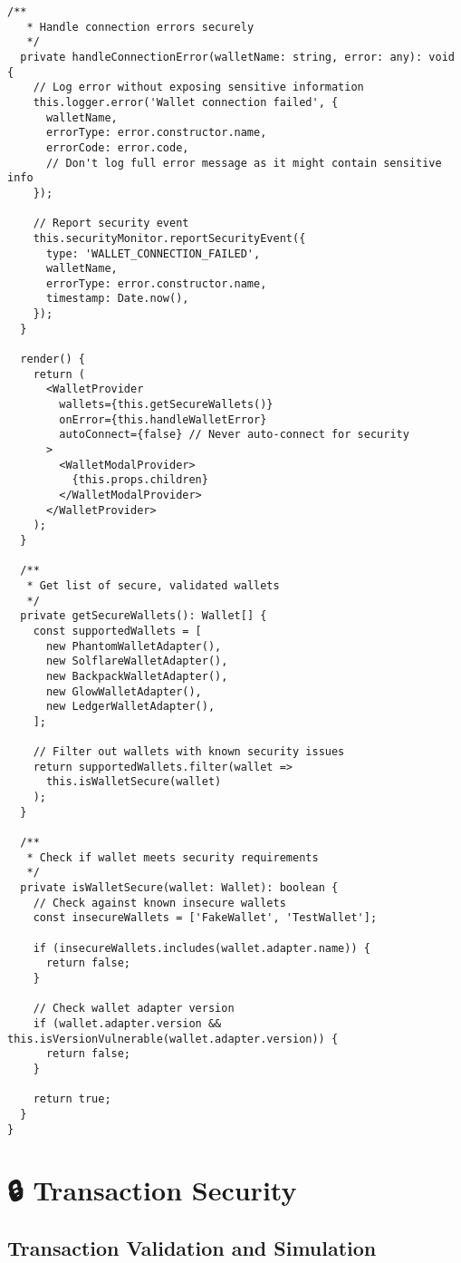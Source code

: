 \documentclass[11pt,a4paper]{article}
\begin{document}
\begin{lstlisting}[style=typescript, caption=Secure Wallet Provider Implementation]
  /**
   * Handle connection errors securely
   */
  private handleConnectionError(walletName: string, error: any): void {
    // Log error without exposing sensitive information
    this.logger.error('Wallet connection failed', {
      walletName,
      errorType: error.constructor.name,
      errorCode: error.code,
      // Don't log full error message as it might contain sensitive info
    });

    // Report security event
    this.securityMonitor.reportSecurityEvent({
      type: 'WALLET_CONNECTION_FAILED',
      walletName,
      errorType: error.constructor.name,
      timestamp: Date.now(),
    });
  }

  render() {
    return (
      <WalletProvider
        wallets={this.getSecureWallets()}
        onError={this.handleWalletError}
        autoConnect={false} // Never auto-connect for security
      >
        <WalletModalProvider>
          {this.props.children}
        </WalletModalProvider>
      </WalletProvider>
    );
  }

  /**
   * Get list of secure, validated wallets
   */
  private getSecureWallets(): Wallet[] {
    const supportedWallets = [
      new PhantomWalletAdapter(),
      new SolflareWalletAdapter(),
      new BackpackWalletAdapter(),
      new GlowWalletAdapter(),
      new LedgerWalletAdapter(),
    ];

    // Filter out wallets with known security issues
    return supportedWallets.filter(wallet => 
      this.isWalletSecure(wallet)
    );
  }

  /**
   * Check if wallet meets security requirements
   */
  private isWalletSecure(wallet: Wallet): boolean {
    // Check against known insecure wallets
    const insecureWallets = ['FakeWallet', 'TestWallet'];
    
    if (insecureWallets.includes(wallet.adapter.name)) {
      return false;
    }

    // Check wallet adapter version
    if (wallet.adapter.version && this.isVersionVulnerable(wallet.adapter.version)) {
      return false;
    }

    return true;
  }
}
\end{lstlisting}

\section{🔒 Transaction Security}

\subsection{Transaction Validation and Simulation}
\end{document}
